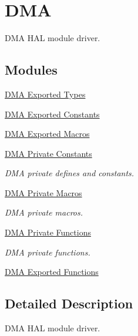 \hypertarget{group___d_m_a}{\section{D\-M\-A}
\label{group___d_m_a}
}


D\-M\-A H\-A\-L module driver.  


\subsection*{Modules}
\begin{DoxyCompactItemize}
\item 
\hyperlink{group___d_m_a___exported___types}{D\-M\-A Exported Types}
\item 
\hyperlink{group___d_m_a___exported___constants}{D\-M\-A Exported Constants}
\item 
\hyperlink{group___d_m_a___exported___macros}{D\-M\-A Exported Macros}
\item 
\hyperlink{group___d_m_a___private___constants}{D\-M\-A Private Constants}
\begin{DoxyCompactList}\small\item\em D\-M\-A private defines and constants. \end{DoxyCompactList}\item 
\hyperlink{group___d_m_a___private___macros}{D\-M\-A Private Macros}
\begin{DoxyCompactList}\small\item\em D\-M\-A private macros. \end{DoxyCompactList}\item 
\hyperlink{group___d_m_a___private___functions}{D\-M\-A Private Functions}
\begin{DoxyCompactList}\small\item\em D\-M\-A private functions. \end{DoxyCompactList}\item 
\hyperlink{group___d_m_a___exported___functions}{D\-M\-A Exported Functions}
\end{DoxyCompactItemize}


\subsection{Detailed Description}
D\-M\-A H\-A\-L module driver. 